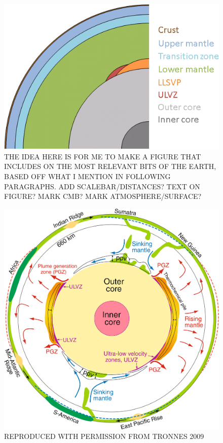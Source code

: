 \begin{figure}[h!]
  \includegraphics[width=\linewidth]{Figures/pp_earth_diagram2.png}
  \caption[EARTH STRUCTURE DIAGRAM]{THE IDEA HERE IS FOR ME TO MAKE A FIGURE THAT INCLUDES ON THE MOST RELEVANT BITS OF THE EARTH, BASED OFF WHAT I MENTION IN FOLLOWING PARAGRAPHS. ADD SCALEBAR/DISTANCES? TEXT ON FIGURE? MARK CMB? MARK ATMOSPHERE/SURFACE?}
  \label{fig:earth_diagram}
\end{figure}

\begin{figure}[h!]
  \includegraphics[width=\linewidth]{Figures/tronnes_earth_diagram.png}
  \caption[TRONNES EARTH STRUCTURE DIAGRAM]{REPRODUCED WITH PERMISSION FROM TRONNES 2009}
  \label{fig:tronnes_earth_diagram}
\end{figure}



